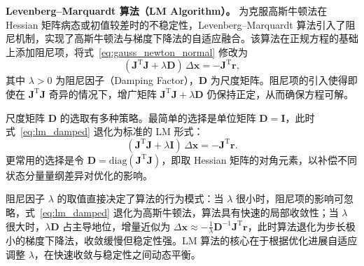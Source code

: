 \textbf{Levenberg--Marquardt 算法（LM Algorithm）。}
为克服高斯牛顿法在 Hessian 矩阵病态或初值较差时的不稳定性，Levenberg--Marquardt 算法引入了阻尼机制，实现了高斯牛顿法与梯度下降法的自适应融合。该算法在正规方程的基础上添加阻尼项，将式~\eqref{eq:gauss_newton_normal} 修改为
\begin{equation}
(\mathbf{J}^{\mathrm{T}}\mathbf{J} + \lambda\mathbf{D})\,\Delta\mathbf{x} = -\mathbf{J}^{\mathrm{T}}\mathbf{r},
\label{eq:lm_damped}
\end{equation}
其中 $\lambda>0$ 为阻尼因子（Damping Factor），$\mathbf{D}$ 为尺度矩阵。阻尼项的引入使得即使在 $\mathbf{J}^{\mathrm{T}}\mathbf{J}$ 奇异的情况下，增广矩阵 $\mathbf{J}^{\mathrm{T}}\mathbf{J}+\lambda\mathbf{D}$ 仍保持正定，从而确保方程可解。

尺度矩阵 $\mathbf{D}$ 的选取有多种策略。最简单的选择是单位矩阵 $\mathbf{D}=\mathbf{I}$，此时式~\eqref{eq:lm_damped} 退化为标准的 LM 形式：
\begin{equation}
(\mathbf{J}^{\mathrm{T}}\mathbf{J} + \lambda\mathbf{I})\,\Delta\mathbf{x} = -\mathbf{J}^{\mathrm{T}}\mathbf{r}.
\end{equation}
更常用的选择是令 $\mathbf{D}=\mathrm{diag}(\mathbf{J}^{\mathrm{T}}\mathbf{J})$，即取 Hessian 矩阵的对角元素，以补偿不同状态分量量纲差异对优化的影响。

阻尼因子 $\lambda$ 的取值直接决定了算法的行为模式：当 $\lambda$ 很小时，阻尼项的影响可忽略，式~\eqref{eq:lm_damped} 退化为高斯牛顿法，算法具有快速的局部收敛性；当 $\lambda$ 很大时，$\lambda\mathbf{D}$ 占主导地位，增量近似为 $\Delta\mathbf{x}\approx-\frac{1}{\lambda}\mathbf{D}^{-1}\mathbf{J}^{\mathrm{T}}\mathbf{r}$，此时算法退化为步长极小的梯度下降法，收敛缓慢但稳定性强。LM 算法的核心在于根据优化进展自适应调整 $\lambda$，在快速收敛与稳定性之间动态平衡。

